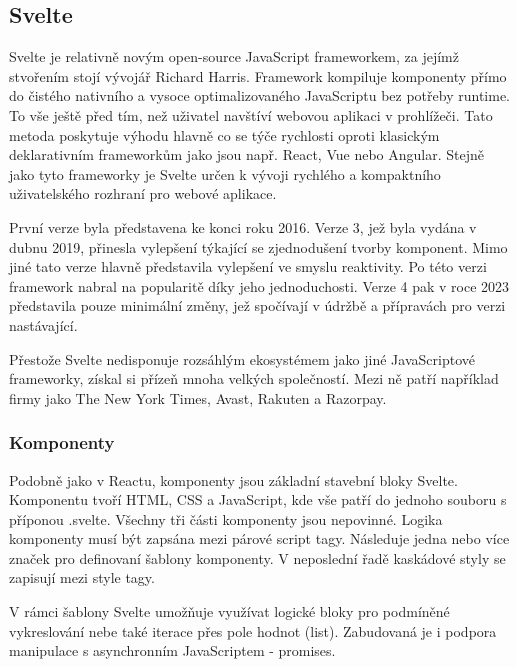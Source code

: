 \subsection{Svelte}

Svelte je relativně novým open-source JavaScript frameworkem, za jejímž stvořením stojí vývojář Richard Harris. 
Framework kompiluje komponenty přímo do čistého nativního a vysoce optimalizovaného JavaScriptu bez potřeby runtime. 
To vše ještě před tím, než uživatel navštíví webovou aplikaci v prohlížeči. 
Tato metoda poskytuje výhodu hlavně co se týče rychlosti oproti klasickým deklarativním frameworkům jako jsou např. React, Vue nebo Angular. 
Stejně jako tyto frameworky je Svelte určen k vývoji rychlého a kompaktního uživatelského rozhraní pro webové aplikace.

První verze byla představena ke konci roku 2016. Verze 3, jež byla vydána v dubnu 2019, přinesla vylepšení týkající se zjednodušení tvorby komponent. 
Mimo jiné tato verze hlavně představila vylepšení ve smyslu reaktivity. Po této verzi framework nabral na popularitě díky jeho jednoduchosti.
Verze 4 pak v roce 2023 představila pouze minimální změny, jež spočívají v údržbě a přípravách pro verzi nastávající.

Přestože Svelte nedisponuje rozsáhlým ekosystémem jako jiné JavaScriptové frameworky, získal si přízeň mnoha velkých společností. 
Mezi ně patří například firmy jako The New York Times, Avast, Rakuten a Razorpay.\cite{sveltemdn,svelte,sveltedevinterface}

\subsubsection{Komponenty}

Podobně jako v Reactu, komponenty jsou základní stavební bloky Svelte. Komponentu tvoří HTML, CSS a JavaScript, kde vše patří do jednoho souboru s příponou .svelte. 
Všechny tři části komponenty jsou nepovinné. Logika komponenty musí být zapsána mezi párové script tagy. Následuje jedna nebo více značek pro definovaní šablony komponenty. 
V neposlední řadě kaskádové styly se zapisují mezi style tagy.

V rámci šablony Svelte umožňuje využívat logické bloky pro podmíněné vykreslování nebe také iterace přes pole hodnot (list). 
Zabudovaná je i podpora manipulace s asynchronním JavaScriptem - promises.\cite{svelte}


